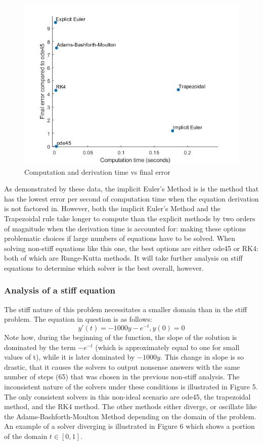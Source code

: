 \documentclass[11pt]{article}
\begin{document}
\newpage

\begin{figure} [h]
\centering
        \includegraphics[totalheight=10cm]{scatter2.jpg}
    \caption{Computation and derivation time vs final error}
    \label{figure4}
\end{figure}

As demonstrated by these data, the implicit Euler's Method is is the method 
that has the lowest error per second of computation time when the equation
derivation is not factored in. However, both the implicit Euler's Method and 
the Trapezoidal rule take longer to compute than the explicit methods by two orders
of magnitude when the derivation time is accounted for: making these options
problematic choices if large numbers of equations have to be solved. When solving
non-stiff equations like this one, the best options are either ode45 or RK4: both
of which are Runge-Kutta methods. It will take further analysis on stiff equations
to determine which solver is the best overall, however.

\subsubsection{Analysis of a stiff equation}
%
The stiff nature of this problem necessitates a 
smaller domain than in the stiff problem. The equation in question is as follows: 
$$y'(t)=-1000y-e^{-t}, y(0)=0$$
Note how, during the beginning of the function, the slope of the solution is 
dominated by the term $-e^{-t}$ (which is approximately equal to one for small 
values of t), while it is later dominated by $-1000y$. This change in slope is so
drastic, that it causes the solvers to output nonsense answers with the same
number of steps (65) that was chosen in the previous
non-stiff analysis. The inconsistent nature of the solvers under these conditions
is illustrated in Figure 5. The only consistent solvers in this non-ideal scenario
are ode45, the trapezoidal method, and the RK4 method. The other methods either
diverge, or oscillate like the Adams-Bashforth-Moulton Method depending on the 
domain of the problem. An example of a solver diverging is illustrated in Figure
6 which shows a portion of the domain $t\in [0,1]$.
\end{document}
